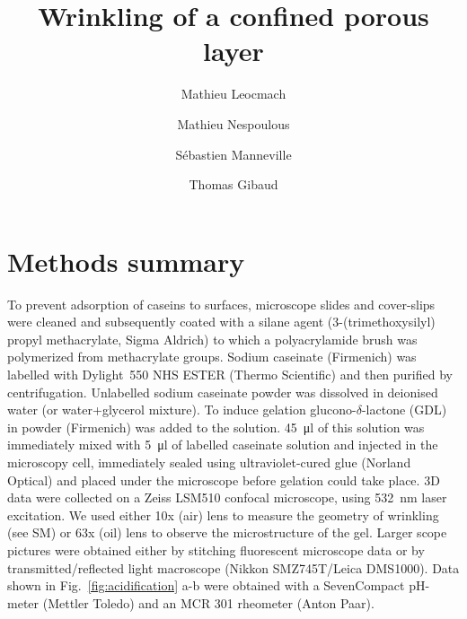 \documentclass[twocolumn,superscriptaddress,showpacs,preprintnumbers,amsmath,amssymb,prl]{revtex4-1}
\begin{document}
\title{Wrinkling of a confined porous layer}
\author{Mathieu Leocmach}
\author{Mathieu Nespoulous}
\author{Sébastien Manneville}
\author{Thomas Gibaud}

\begin{abstract}

\end{abstract}

\maketitle

\section*{Methods summary}
To prevent adsorption of caseins to surfaces, microscope slides and cover-slips were cleaned and subsequently coated with a silane agent (3-(trimethoxysilyl) propyl methacrylate, Sigma Aldrich) to which a polyacrylamide brush was polymerized from methacrylate groups.
Sodium caseinate (Firmenich) was labelled with Dylight~550 NHS ESTER (Thermo Scientific) and then purified by centrifugation. Unlabelled sodium caseinate powder was dissolved in deionised water (or water+glycerol mixture). To induce gelation glucono-$\delta$-lactone (GDL) in powder (Firmenich) was added to the solution. \SI{45}{\micro\litre} of this solution was immediately mixed with \SI{5}{\micro\litre} of labelled caseinate solution and injected in the microscopy cell, immediately sealed using ultraviolet-cured glue (Norland Optical) and placed under the microscope before gelation could take place. 
3D data were collected on a Zeiss LSM510 confocal microscope, using \SI{532}{\nano\meter} laser excitation. We used either 10x (air) lens to measure the geometry of wrinkling (see SM) or 63x (oil) lens to observe the microstructure of the gel. Larger scope pictures were obtained either by stitching fluorescent microscope data or by transmitted/reflected light macroscope (Nikkon SMZ745T/Leica DMS1000).
Data shown in Fig.~\ref{fig:acidification} a-b were obtained with a SevenCompact pH-meter (Mettler Toledo) and an MCR 301 rheometer (Anton Paar).
\end{document}
